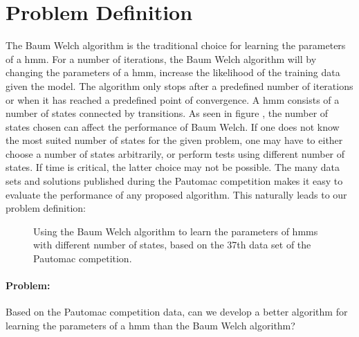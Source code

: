\section{Problem Definition}

The Baum Welch algorithm is the traditional choice for learning the parameters of a \gls{hmm}\cite{pautomacTR}. 
For a number of iterations, the Baum Welch algorithm will by changing the parameters of a \gls{hmm}, increase the likelihood of the training data given the model. The algorithm only stops after a predefined number of iterations or when it has reached a predefined point of convergence.
A \gls{hmm} consists of a number of states connected by transitions. As seen in figure , the number of states chosen can affect the performance of Baum Welch. If one does not know the most suited number of states for the given problem, one may have to either choose a number of states arbitrarily, or perform tests using different number of states. If time is critical, the latter choice may not be possible.
The many data sets and solutions published during the Pautomac competition makes it easy to evaluate the performance of any proposed algorithm.
This naturally leads to our problem definition:

\begin{figure}
\begin{centering}
\caption{Using the Baum Welch algorithm to learn the parameters of \gls{hmm}s with different number of states, based on the 37th data set of the Pautomac competition.}
\label{fig:bw-states-are-important} 
\end{centering}
\end{figure}


\paragraph{Problem:}

Based on the Pautomac competition data, can we develop a better algorithm for learning the parameters of a \gls{hmm} than the Baum Welch algorithm?
